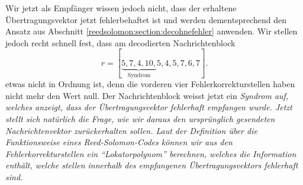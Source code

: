 %
Wir jetzt als Empfänger wissen jedoch nicht, dass der erhaltene Übertragungsvektor jetzt fehlerbehaftet ist und werden dementsprechend den Ansatz aus Abschnitt \ref{reedsolomon:section:decohnefehler} anwenden.
Wir stellen jedoch recht schnell fest, dass am decodierten Nachrichtenblock
\[
r = [\underbrace{5,7,4,10,}_{\text{Syndrom}}5,4,5,7,6,7].
\]
etwas nicht in Ordnung ist, denn die vorderen vier Fehlerkorrekturstellen haben nicht mehr den Wert null.
Der Nachrichtenblock weisst jetzt ein \em Syndrom \em auf, welches anzeigt, dass der Übertragungsvektor fehlerhaft empfangen wurde.
Jetzt stellt sich natürlich die Frage, wie wir daraus den ursprünglich gesendeten Nachrichtenvektor zurückerhalten sollen. Laut der Definition über die Funktionsweise eines Reed-Solomon-Codes können wir aus den Fehlerkorrekturstellen ein ``Lokatorpolynom'' berechnen, welches die Information enthält, welche stellen innerhalb des empfangenen Übertragungsvektors fehlerhaft sind.

